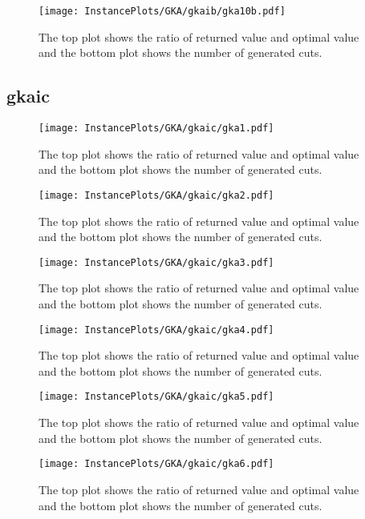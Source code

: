 \documentclass[10pt,a4paper]{article}
\begin{document}
\begin{figure}[H]
\texttt{[image: InstancePlots/GKA/gkaib/gka10b.pdf]}
\caption{The top plot shows the ratio of returned value and optimal value     and the bottom plot shows the number of generated cuts.}
\end{figure}

\subsection{gkaic}
\begin{figure}[H]
\texttt{[image: InstancePlots/GKA/gkaic/gka1.pdf]}
\caption{The top plot shows the ratio of returned value and optimal value     and the bottom plot shows the number of generated cuts.}
\end{figure}

\begin{figure}[H]
\texttt{[image: InstancePlots/GKA/gkaic/gka2.pdf]}
\caption{The top plot shows the ratio of returned value and optimal value     and the bottom plot shows the number of generated cuts.}
\end{figure}

\begin{figure}[H]
\texttt{[image: InstancePlots/GKA/gkaic/gka3.pdf]}
\caption{The top plot shows the ratio of returned value and optimal value     and the bottom plot shows the number of generated cuts.}
\end{figure}

\begin{figure}[H]
\texttt{[image: InstancePlots/GKA/gkaic/gka4.pdf]}
\caption{The top plot shows the ratio of returned value and optimal value     and the bottom plot shows the number of generated cuts.}
\end{figure}

\begin{figure}[H]
\texttt{[image: InstancePlots/GKA/gkaic/gka5.pdf]}
\caption{The top plot shows the ratio of returned value and optimal value     and the bottom plot shows the number of generated cuts.}
\end{figure}

\begin{figure}[H]
\texttt{[image: InstancePlots/GKA/gkaic/gka6.pdf]}
\caption{The top plot shows the ratio of returned value and optimal value     and the bottom plot shows the number of generated cuts.}
\end{figure}
\end{document}
